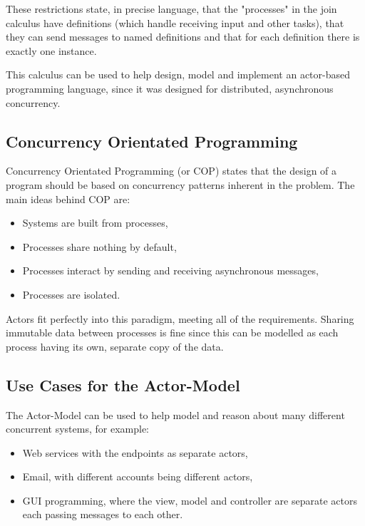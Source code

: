 \documentclass[11pt,a4paper]{report}
\begin{document}
These restrictions state, in precise language, that the "processes" in the join calculus have definitions (which handle receiving input and other tasks), that they can send messages to named definitions and that for each definition there is exactly one instance.

This calculus can be used to help design, model and implement an actor-based programming language, since it was designed for distributed, asynchronous concurrency\cite{fournet1996}.

\subsection{Concurrency Orientated Programming}
Concurrency Orientated Programming\cite{armstrong2007} (or COP) states that the design of a program should be based on concurrency patterns inherent in the problem.
The main ideas behind COP are:
\begin{itemize}[noitemsep]
\item Systems are built from processes,
\item Processes share nothing by default,
\item Processes interact by sending and receiving asynchronous messages,
\item Processes are isolated.
\end{itemize}

Actors fit perfectly into this paradigm, meeting all of the requirements.
Sharing immutable data between processes is fine since this can be modelled as each process having its own, separate copy of the data.

\subsection{Use Cases for the Actor-Model}

The Actor-Model can be used to help model and reason about many different concurrent systems\cite{hewitt2006}, for example:

\begin{itemize}[noitemsep]
\item Web services with the endpoints as separate actors,
\item Email, with different accounts being different actors,
\item GUI programming, where the view, model and controller are separate actors 	 each passing messages to each other.
\end{itemize}
\end{document}
